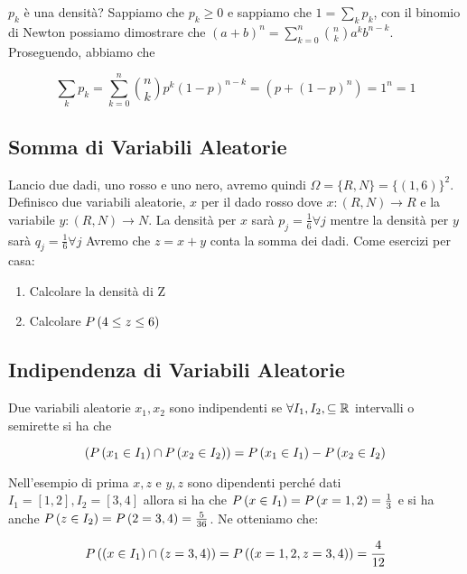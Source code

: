 $ p_k $ è una densità? Sappiamo che $ p_k \geq 0 $ e sappiamo che $ 1 = \sum_{k} p_k $, con il binomio di Newton possiamo dimostrare che $ (a+b)^n = \sum_{k=0}^{n} \binom{n}{k} a^k b^{n-k} $. Proseguendo, abbiamo che 

\[ \sum_{k} p_k = \sum_{k=0}^{n} \binom{n}{k} p^k (1-p)^{n-k} = (p+(1-p)^n) = 1^n = 1 \]

\subsection{Somma di Variabili Aleatorie}
Lancio due dadi, uno rosso e uno nero, avremo quindi $ \Omega = \{R, N\} = \{(1,6)\}^2 $. Definisco due variabili aleatorie, $ x $ per il dado rosso dove $ x : (R, N) \to R $ e la variabile $ y : (R, N) \to N $. La densità per $ x $ sarà $ p_j = \frac{1}{6} \forall j $ mentre la densità per $ y $ sarà $ q_j = \frac{1}{6} \forall j $
Avremo che $ z = x + y $ conta la somma dei dadi. Come esercizi per casa:
\begin{enumerate}
	\item Calcolare la densità di Z
	\item Calcolare $ P\left(4 \leq z \leq 6\right) $
\end{enumerate}


\subsection{Indipendenza di Variabili Aleatorie}

Due variabili aleatorie $ x_1, x_2 $ sono indipendenti se $ \forall I_1, I_2, \subseteq \mathbb{R} $ intervalli o semirette si ha che 

\[ \left( P\left(x_1 \in I_1\right) \cap P\left(x_2 \in I_2\right) \right) = P\left(x_1 \in I_1\right) - P\left(x_2 \in I_2\right) \]

Nell'esempio di prima $ x, z $ e $ y,z $ sono dipendenti perché dati $ I_1 = [1,2], I_2 = [3,4] $ allora si ha che $ P\left(x\in I_1\right) = P\left(x=1,2\right) = \frac{1}{3} $ e si ha anche $ P\left(z \in I_2\right) = P\left(2 = 3,4\right) = \frac{5}{36} $. Ne otteniamo che:

\[ P\left((x \in I_1) \cap (z = 3,4)\right) = P\left((x = 1,2, z = 3,4)\right) = \dfrac{4}{12} \]

